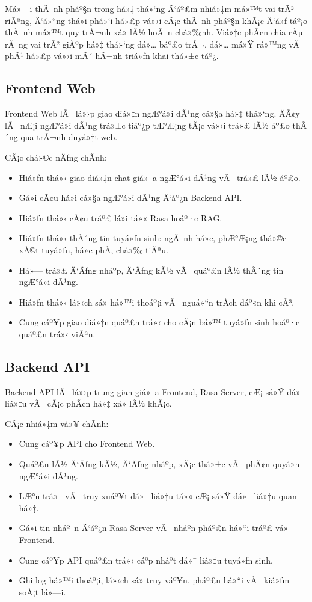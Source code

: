 ﻿\documentclass[12pt,a4paper]{report}
\begin{document}
Má»—i thÃ nh pháº§n trong há»‡ thá»‘ng Ä‘áº£m nhiá»‡m má»™t vai trÃ² riÃªng, Ä‘á»“ng thá»i phá»‘i há»£p vá»›i cÃ¡c thÃ nh pháº§n khÃ¡c Ä‘á»ƒ táº¡o thÃ nh má»™t quy trÃ¬nh xá»­ lÃ½ hoÃ n chá»‰nh. Viá»‡c phÃ¢n chia rÃµ rÃ ng vai trÃ² giÃºp há»‡ thá»‘ng dá»… báº£o trÃ¬, dá»… má»Ÿ rá»™ng vÃ  phÃ¹ há»£p vá»›i mÃ´ hÃ¬nh triá»ƒn khai thá»±c táº¿.

\subsection{Frontend Web}

Frontend Web lÃ  lá»›p giao diá»‡n ngÆ°á»i dÃ¹ng cá»§a há»‡ thá»‘ng. ÄÃ¢y lÃ  nÆ¡i ngÆ°á»i dÃ¹ng trá»±c tiáº¿p tÆ°Æ¡ng tÃ¡c vá»›i trá»£ lÃ½ áº£o thÃ´ng qua trÃ¬nh duyá»‡t web.

CÃ¡c chá»©c nÄƒng chÃ­nh:
\begin{itemize}
    \item Hiá»ƒn thá»‹ giao diá»‡n chat giá»¯a ngÆ°á»i dÃ¹ng vÃ  trá»£ lÃ½ áº£o.
    \item Gá»­i cÃ¢u há»i cá»§a ngÆ°á»i dÃ¹ng Ä‘áº¿n Backend API.
    \item Hiá»ƒn thá»‹ cÃ¢u tráº£ lá»i tá»« Rasa hoáº·c RAG.
    \item Hiá»ƒn thá»‹ thÃ´ng tin tuyá»ƒn sinh: ngÃ nh há»c, phÆ°Æ¡ng thá»©c xÃ©t tuyá»ƒn, há»c phÃ­, chá»‰ tiÃªu.
    \item Há»— trá»£ Ä‘Äƒng nháº­p, Ä‘Äƒng kÃ½ vÃ  quáº£n lÃ½ thÃ´ng tin ngÆ°á»i dÃ¹ng.
    \item Hiá»ƒn thá»‹ lá»‹ch sá»­ há»™i thoáº¡i vÃ  nguá»“n trÃ­ch dáº«n khi cÃ³.
    \item Cung cáº¥p giao diá»‡n quáº£n trá»‹ cho cÃ¡n bá»™ tuyá»ƒn sinh hoáº·c quáº£n trá»‹ viÃªn.
\end{itemize}

\subsection{Backend API}

Backend API lÃ  lá»›p trung gian giá»¯a Frontend, Rasa Server, cÆ¡ sá»Ÿ dá»¯ liá»‡u vÃ  cÃ¡c phÃ¢n há»‡ xá»­ lÃ½ khÃ¡c.

CÃ¡c nhiá»‡m vá»¥ chÃ­nh:
\begin{itemize}
    \item Cung cáº¥p API cho Frontend Web.
    \item Quáº£n lÃ½ Ä‘Äƒng kÃ½, Ä‘Äƒng nháº­p, xÃ¡c thá»±c vÃ  phÃ¢n quyá»n ngÆ°á»i dÃ¹ng.
    \item LÆ°u trá»¯ vÃ  truy xuáº¥t dá»¯ liá»‡u tá»« cÆ¡ sá»Ÿ dá»¯ liá»‡u quan há»‡.
    \item Gá»­i tin nháº¯n Ä‘áº¿n Rasa Server vÃ  nháº­n pháº£n há»“i tráº£ vá» Frontend.
    \item Cung cáº¥p API quáº£n trá»‹ cáº­p nháº­t dá»¯ liá»‡u tuyá»ƒn sinh.
    \item Ghi log há»™i thoáº¡i, lá»‹ch sá»­ truy váº¥n, pháº£n há»“i vÃ  kiá»ƒm soÃ¡t lá»—i.
\end{itemize}
\end{document}
